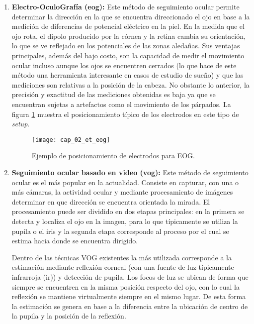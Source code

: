 \documentclass[../main.tex]{subfiles}
\begin{document}
\begin{enumerate}
				\item \textbf{Electro-OculoGrafía (\acrshort{eog}):} Este método de seguimiento ocular permite determinar la dirección en la que se encuentra direccionado el ojo en base a la medición de diferencias de potencial eléctrico en la piel. En la medida que el ojo rota, el dipolo producido por la córnea y la retina cambia su orientación, lo que se ve reflejado en los potenciales de las zonas aledañas. Sus ventajas principales, además del bajo costo, son la capacidad de medir el movimiento ocular incluso aunque los ojos se encuentren cerrados (lo que hace de este método una herramienta interesante en casos de estudio de sueño) y que las mediciones son relativas a la posición de la cabeza. No obstante lo anterior, la precisión y exactitud de las mediciones obtenidas es baja ya que se encuentran sujetas a artefactos como el movimiento de los párpados. La figura \ref{fig:02_et_eog} muestra el posicionamiento típico de los electrodos en este tipo de \textit{\gls{setup}}. 
				\begin{figure}[H]
					\centering
					\texttt{[image: cap\_02\_et\_eog]}
					\caption[Ejemplo de posicionamiento de electrodos para EOG]{Ejemplo de posicionamiento de electrodos para EOG\footnotemark.}
					\label{fig:02_et_eog}
				\end{figure}

				\item \textbf{Seguimiento ocular basado en video (\acrshort{vog}):} Este método de seguimiento ocular es el más popular en la actualidad. Consiste en capturar, con una o más cámaras, la actividad ocular y mediante procesamiento de imágenes determinar en que dirección se encuentra orientada la mirada. El procesamiento puede ser dividido en dos etapas principales: en la primera se detecta y localiza el ojo en la imagen, para lo que típicamente se utiliza la pupila o el iris y la segunda etapa corresponde al proceso por el cual se estima hacia donde se encuentra dirigido. 

				Dentro de las técnicas VOG existentes la más utilizada corresponde a la estimación mediante reflexión corneal (con una fuente de luz típicamente infrarroja (\acrshort{ir})) y detección de pupila. Los focos de luz se ubican de forma que siempre se encuentren en la misma posición respecto del ojo, con lo cual la reflexión se mantiene virtualmente siempre en el mismo lugar. De esta forma la estimación se genera en base a la diferencia entre la ubicación de centro de la pupila y la posición de la reflexión.  


\end{enumerate}
\end{document}
